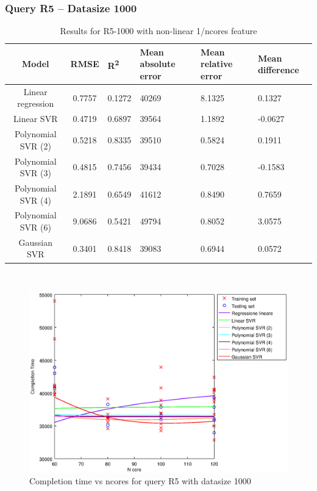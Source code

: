 \documentclass[a4paper,11pt]{article}
\begin{document}
\newpage
\subsubsection{Query R5 -- Datasize 1000}
\begin{table}[H]
	\centering
	\begin{adjustbox}{center}
		\begin{tabular}{c | c M{1.2cm} M{2.5cm} M{2.5cm} M{1.8cm}}
			Model & RMSE & R\textsuperscript{2} & Mean absolute error & Mean relative error & Mean difference \tabularnewline
			\hline
			Linear regression & 0.7757 & 0.1272 &  40269 & 8.1325 & 0.1327 \\
			Linear SVR & 0.4719 & 0.6897 &  39564 & 1.1892 & -0.0627 \\
			Polynomial SVR (2) & 0.5218 & 0.8335 &  39510 & 0.5824 & 0.1911 \\
			Polynomial SVR (3) & 0.4815 & 0.7456 &  39434 & 0.7028 & -0.1583 \\
			Polynomial SVR (4) & 2.1891 & 0.6549 &  41612 & 0.8490 & 0.7659 \\
			Polynomial SVR (6) & 9.0686 & 0.5421 &  49794 & 0.8052 & 3.0575 \\
			Gaussian SVR & 0.3401 & 0.8418 &  39083 & 0.6944 & 0.0572 \\
		\end{tabular}
	\end{adjustbox}
	\\
	\caption{Results for R5-1000 with non-linear 1/ncores feature}
	\label{table_R5_prediction_all}
\end{table}

\begin {figure}[hbtp]
\centering
\includegraphics[width=\textwidth]{output/R5_1000_1_OVER_NCORES/plot_R5_1000.eps}
\caption {Completion time vs ncores for query R5 with datasize 1000}
\end {figure}
\end{document}

